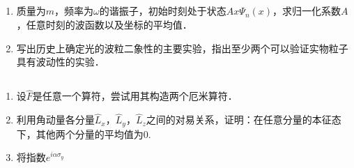 
\subsection{ }
\begin{enumerate}
\item 质量为$m$，频率为$\omega$的谐振子，初始时刻处于状态$Ax\varPsi_{n}(x)$，求归一化系数$A$，任意时刻的波函数以及坐标的平均值．
\item 写出历史上确定光的波粒二象性的主要实验，指出至少两个可以验证实物粒子具有波动性的实验．
\end{enumerate}
\subsection{ }
\begin{enumerate}
\item 设$\hat{F}$是任意一个算符，尝试用其构造两个厄米算符．
\item 利用角动量各分量$\hat{L}_{x}$，$\hat{L}_{y}$，$\hat{L}_{z}$之间的对易关系，证明：在任意分量的本征态下，其他两个分量的平均值为0.
\item 将指数$e^{i\alpha \sigma_{y}}$
\end{enumerate}